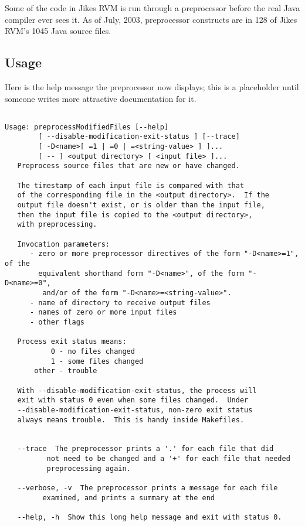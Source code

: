 Some of the code in Jikes RVM is run through a preprocessor before the
real Java compiler ever sees it.  As of July, 2003, preprocessor
constructs are in 128 of Jikes RVM's 1045 Java source files.

\subsection{Usage}

Here is the help message the preprocessor now displays; this
is a placeholder until someone writes more attractive documentation
for it.

\begin{verbatim}

Usage: preprocessModifiedFiles [--help]
        [ --disable-modification-exit-status ] [--trace]
        [ -D<name>[ =1 | =0 | =<string-value> ] ]... 
        [ -- ] <output directory> [ <input file> ]...
   Preprocess source files that are new or have changed.

   The timestamp of each input file is compared with that
   of the corresponding file in the <output directory>.  If the
   output file doesn't exist, or is older than the input file,
   then the input file is copied to the <output directory>, 
   with preprocessing.

   Invocation parameters:
      - zero or more preprocessor directives of the form "-D<name>=1", of the
        equivalent shorthand form "-D<name>", of the form "-D<name>=0",
         and/or of the form "-D<name>=<string-value>".
      - name of directory to receive output files
      - names of zero or more input files
      - other flags

   Process exit status means:
           0 - no files changed
           1 - some files changed
       other - trouble

   With --disable-modification-exit-status, the process will
   exit with status 0 even when some files changed.  Under
   --disable-modification-exit-status, non-zero exit status
   always means trouble.  This is handy inside Makefiles.


   --trace  The preprocessor prints a '.' for each file that did
          not need to be changed and a '+' for each file that needed
          preprocessing again.

   --verbose, -v  The preprocessor prints a message for each file
         examined, and prints a summary at the end 

   --help, -h  Show this long help message and exit with status 0.


\end{verbatim}
